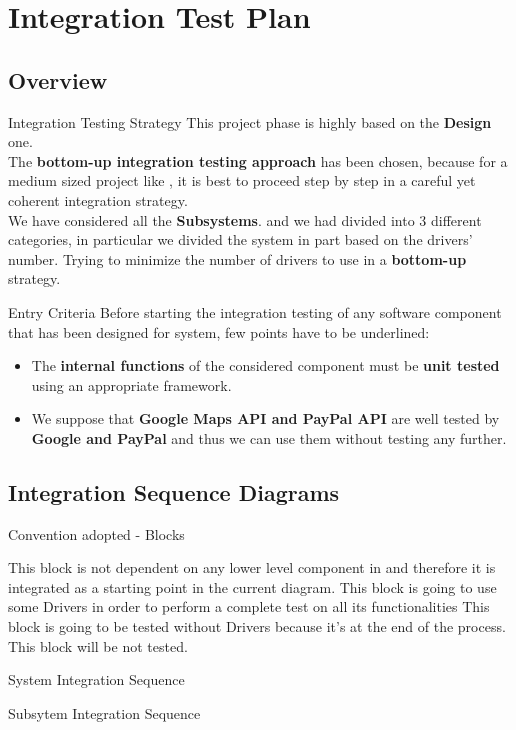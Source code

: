 \documentclass{../Common/Structure/pdf_presentation}
\begin{document}
	\section{Integration Test Plan}
	\subsection{Overview}
	\begin{frame}{Integration Testing Strategy}
		This project phase is highly based on the \textbf{Design} one. \\
		\medskip
		The \textbf{bottom-up integration testing approach} has been chosen, because for a medium sized project like \PowerEnJoy{}, it is best to proceed step by step in a careful yet coherent integration strategy.\\
		\medskip
		We have considered all the \textbf{Subsystems}. and we had divided into 3 different categories, in particular we divided the system in part based on the drivers' number. Trying to minimize the number of drivers to use in a \textbf{bottom-up} strategy.\\
	\end{frame}
	\begin{frame}{Entry Criteria}
		Before starting the integration testing of any software component that has been designed for \PowerEnJoy{} system, few points have to be underlined:
		\begin{itemize}
			 \item The \textbf{internal functions} of the considered component must be \textbf{unit tested} using an appropriate framework.
			 \item We suppose that \textbf{Google Maps API and PayPal API} are well tested by \textbf{Google and PayPal} and thus we can use them without testing any
			 further.
		\end{itemize}
	\end{frame}
	\subsection{Integration Sequence Diagrams}
	\begin{frame}{Convention adopted - Blocks}
		\begin{itemize}
			 This block is not dependent on any lower level component in \PowerEnJoy{} and therefore it is integrated as a starting point in the current diagram.
			 This block is going to use some Drivers in order to perform a complete test on all its functionalities
			 This block is going to be tested without Drivers because it's at the end of the process.
				This block will be not tested.
		\end{itemize}
	\end{frame}
	\begin{frame}{System Integration Sequence}
	\end{frame}
	\begin{frame}{Subsytem Integration Sequence}
	\end{frame}
\end{document}
